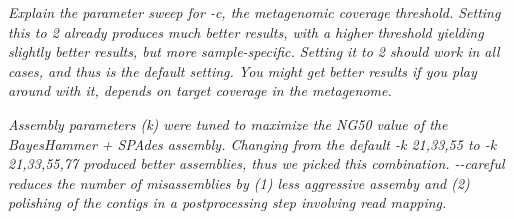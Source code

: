 \documentclass{bioinfo2}
\begin{document}
\textit{Explain the parameter sweep for -c, the metagenomic coverage threshold. Setting this to 2 already produces much better results, with a higher threshold yielding slightly better results, but more sample-specific. Setting it to 2 should work in all cases, and thus is the default setting. You might get better results if you play around with it, depends on target coverage in the metagenome.}

\textit{Assembly parameters (k) were tuned to maximize the NG50 value of the BayesHammer + SPAdes assembly. Changing from the default -k 21,33,55 to -k 21,33,55,77 produced better assemblies, thus we picked this combination. -{}-careful reduces the number of misassemblies by (1) less aggressive assemby and (2) polishing of the contigs in a postprocessing step involving read mapping.}


\end{document}
